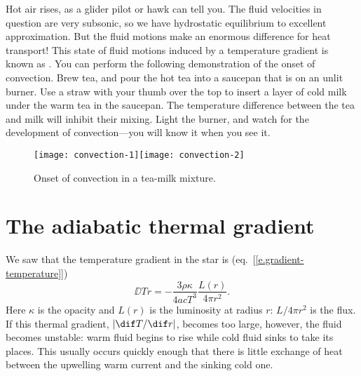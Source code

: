 
Hot air rises, as a glider pilot or hawk can tell you. The fluid velocities in question are very subsonic, so we have hydrostatic equilibrium to excellent approximation. But the fluid motions make an enormous difference for heat transport! This state of fluid motions induced by a temperature gradient is known as . You can perform the following demonstration of the onset of convection.  Brew tea, and pour the hot tea into a saucepan that is on an unlit burner.  Use a straw with your thumb over the top to insert a layer of cold milk under the warm tea in the saucepan.  The temperature difference between the tea and milk will inhibit their mixing. Light the burner, and watch for the development of convection---you will know it when you see it.

\begin{figure}[htbp]
\texttt{[image: convection-1]}\texttt{[image: convection-2]}
\caption{Onset of convection in a tea-milk mixture.\label{f.tea}}
\end{figure}

\section{The adiabatic thermal gradient}\label{s.adiabatic-gradient}

We saw that the temperature gradient in the star is (eq.~[\ref{e.gradient-temperature}])
\[
    \DD{T}{r} = -\frac{3\rho\kappa}{4acT^3}\frac{L(r)}{4\pi r^2}.
\]
Here $\kappa$ is the opacity and $L(r)$ is the luminosity at radius $r$: $L/4\pi r^2$ is the flux. If this thermal gradient, $|\dif T/\dif r|$, becomes too large, however, the fluid becomes unstable: warm fluid begins to rise while cold fluid sinks to take its places.  This usually occurs quickly enough that there is little exchange of heat between the upwelling warm current and the sinking cold one.

